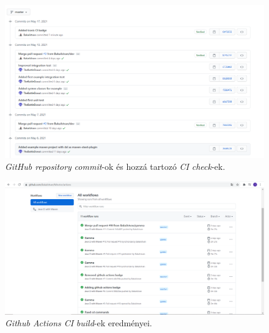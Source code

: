 \begin{figure}[!ht]
    \centering
    \includegraphics[width=150mm, keepaspectratio]{figures/github_ci_check.png}
    \caption{\textit{GitHub repository} \textit{commit}-ok és hozzá tartozó \textit{CI} \textit{check}-ek.}
    \label{commit_ci_check}
\end{figure}

\begin{figure}[!ht]
    \centering
    \includegraphics[width=150mm, keepaspectratio]{figures/github_ci_builds.png}
    \caption{\textit{Github Actions CI} \textit{build}-ek eredményei.}
    \label{github_actions}
\end{figure}

